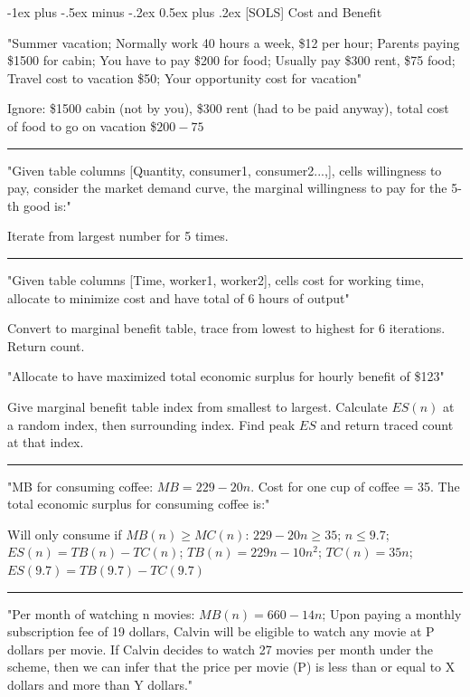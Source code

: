 \documentclass[a4paper]{article}
\makeatletter
\renewcommand{\section}{\@startsection{section}{1}{0mm}%
                                {-1ex plus -.5ex minus -.2ex}%
                                {0.5ex plus .2ex}%
                                {\normalfont\large\bfseries}}
\makeatother
\begin{document}
\begin{multicols*}{3}
    \tiny

    \section{[SOLS] Cost and Benefit}

    "Summer vacation; Normally work 40 hours a week, \$12 per hour; Parents paying \$1500 for cabin; You have to pay \$200 for food; Usually pay \$300 rent, \$75 food; Travel cost to vacation \$50; Your opportunity cost for vacation"

    Ignore: \$1500 cabin (not by you), \$300 rent (had to be paid anyway), total cost of food to go on vacation \$$200-75$

        \rule{1\linewidth}{0.4pt}

        "Given table columns [Quantity, consumer1, consumer2...,], cells willingness to pay, consider the market demand curve, the marginal willingness to pay for the 5-th good is:"

        Iterate from largest number for 5 times.

        \rule{1\linewidth}{0.4pt}

        "Given table columns [Time, worker1, worker2], cells cost for working time, allocate to minimize cost and have total of 6 hours of output"

        Convert to marginal benefit table, trace from lowest to highest for 6 iterations. Return count.

        "Allocate to have maximized total economic surplus for hourly benefit of \$123"

        Give marginal benefit table index from smallest to largest. Calculate $ES(n)$ at a random index, then surrounding index. Find peak $ES$ and return traced count at that index.

        \rule{1\linewidth}{0.4pt}

        "MB for consuming coffee: $MB=229-20n$. Cost for one cup of coffee = 35. The total economic surplus for consuming coffee is:"

        Will only consume if $MB(n) \geq MC(n)$: $229-20n \geq 35$; $n \leq 9.7$; $ES(n) = TB(n) - TC(n)$; $TB(n) = 229n - 10n^2$; $TC(n) = 35n$; $ES(9.7) = TB(9.7) - TC(9.7)$

        \rule{1\linewidth}{0.4pt}

        "Per month of watching n movies: $MB(n)=660-14n$; Upon paying a monthly subscription fee of 19 dollars, Calvin will be eligible to watch any movie at P dollars per movie. If Calvin decides to watch 27 movies per month under the scheme, then we can infer that the price per movie (P) is less than or equal to X dollars and more than Y dollars."


\end{multicols*}
\end{document}
